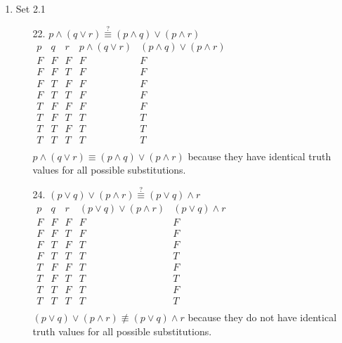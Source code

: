 \documentclass[letterpaper]{article}
\begin{document}
\begin{enumerate}
\begin{enumerate}
			\item Set 2.1 
			\begin{itemize}
				\item [22.]
				$p \wedge  \left( q \vee r \right) \stackrel{?}{\equiv} \left( p \wedge q \right) \vee \left( p \wedge r \right)$ \\
				$\begin{array}{c|c|c|c|c}
					p & q & r & p \wedge  \left( q \vee r \right) & \left( p \wedge q \right) \vee \left( p \wedge r \right) \\ \hline
					F & F & F & F & F \\ \hline
					F & F & T & F & F \\ \hline
					F & T & F & F & F \\ \hline
					F & T & T & F & F \\ \hline
					T & F & F & F & F \\ \hline
					T & F & T & T & T \\ \hline
					T & T & F & T & T \\ \hline
					T & T & T & T & T \\ 
				\end{array}$ \\
				$p \wedge \left( q \vee r \right) \equiv \left( p \wedge q \right) \vee \left( p \wedge r \right)$ because they have identical truth values for all possible substitutions.
				\item [24.]
				$\left( p \vee q \right) \vee \left( p \wedge r \right) \stackrel{?}{\equiv} \left( p \vee q \right) \wedge r$ \\
				$\begin{array}{c|c|c|c|c}
					p & q & r & \left( p \vee q \right) \vee \left( p \wedge r \right) & \left( p \vee q \right) \wedge r \\ \hline
					F & F & F & F & F \\ \hline
					F & F & T & F & F \\ \hline
					F & T & F & T & F \\ \hline
					F & T & T & T & T \\ \hline
					T & F & F & T & F \\ \hline
					T & F & T & T & T \\ \hline
					T & T & F & T & F \\ \hline
					T & T & T & T & T \\ 
				\end{array}$ \\
				$\left( p \vee q \right) \vee \left( p \wedge r \right) \not\equiv \left( p \vee q \right) \wedge r$ because they do not have identical truth values for all possible substitutions.
			\end{itemize}
		

\end{enumerate}
\end{enumerate}
\end{document}
